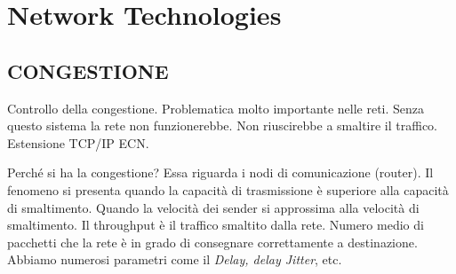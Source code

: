 
\chapter{Network Technologies}
\label{cap:nt}

\section{CONGESTIONE}

Controllo della congestione. Problematica molto importante nelle reti. Senza questo sistema la rete non funzionerebbe. Non riuscirebbe a smaltire il traffico. Estensione TCP/IP ECN.

Perché si ha la congestione? Essa riguarda i nodi di comunicazione (router). Il fenomeno si presenta quando la capacità di trasmissione è superiore alla capacità di smaltimento. Quando la velocità dei sender si approssima alla velocità di smaltimento. Il throughput è il traffico smaltito dalla rete. Numero medio di pacchetti che la rete è in grado di consegnare correttamente a destinazione. Abbiamo numerosi parametri come il \textit{Delay, delay Jitter}, etc. 

